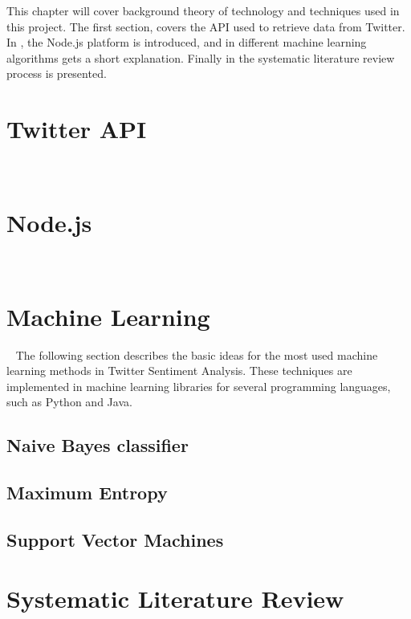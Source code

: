 This chapter will cover background theory of technology and techniques used in this project. 
The first section,  covers the API used to retrieve data from Twitter. In , the Node.js platform is introduced, and in  different machine learning algorithms gets a short explanation. Finally in  the systematic literature review process is presented. 


\section{Twitter API}~\label{sec:twitterapi}


\section{Node.js}~\label{sec:nodejs}
	

\section{Machine Learning}~\label{sec:ml}
The following section describes the basic ideas for the most used machine learning methods in Twitter Sentiment Analysis. These techniques are implemented in machine learning libraries for several programming languages, such as Python and Java.
	\subsection{Naive Bayes classifier}
	
	
	\subsection{Maximum Entropy}
	
	
	\subsection{Support Vector Machines}
	

\section{Systematic Literature Review}~\label{sec:backgroundslr}
